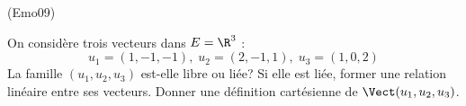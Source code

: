 \begin{tiny}(Emo09)\end{tiny}
On consid{\`e}re trois vecteurs dans $E=\R^{3}$ :
\begin{displaymath}
u_{1} = (1,-1,-1),\;
u_{2} = (2,-1,1),\;
u_{3} = (1,0,2)
\end{displaymath}
La famille $(u_{1},u_{2},u_{3})$ est-elle libre ou li{\'e}e? Si elle est li{\'e}e, former une relation lin{\'e}aire entre ses vecteurs. Donner une d{\'e}finition cart{\'e}sienne de $\Vect(u_{1},u_{2},u_{3})$.
